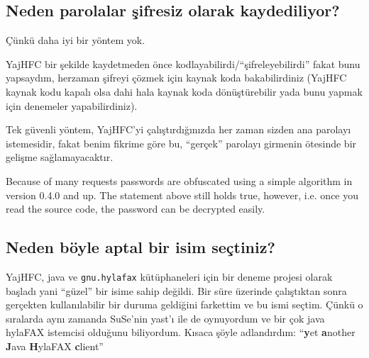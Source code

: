 \documentclass[a4paper,10pt]{scrartcl}
\begin{document}
\subsection{Neden parolalar şifresiz olarak kaydediliyor?}

Çünkü daha iyi bir yöntem yok.

YajHFC bir şekilde kaydetmeden önce kodlayabilirdi/``şifreleyebilirdi'' fakat
bunu yapsaydım, herzaman şifreyi çözmek için kaynak koda bakabilirdiniz 
(YajHFC kaynak kodu kapalı olsa dahi hala kaynak koda dönüştürebilir 
yada bunu yapmak için denemeler yapabilirdiniz).

Tek güvenli yöntem, YajHFC'yi çalıştırdığınızda her zaman sizden ana parolayı 
istemesidir, fakat benim fikrime göre bu, ``gerçek'' parolayı girmenin ötesinde
bir gelişme sağlamayacaktır.

Because of many requests passwords are obfuscated using a simple algorithm in version 0.4.0 and up.
The statement above still holds true, however, i.e. once you read the source code, the password can be decrypted easily.

\subsection{Neden böyle aptal bir isim seçtiniz?}

YajHFC, java ve \texttt{gnu.hylafax} kütüphaneleri için bir deneme projesi olarak başladı
yani ``güzel'' bir isime sahip değildi. Bir süre üzerinde çalıştıktan sonra 
gerçekten kullanılabilir bir duruma geldiğini farkettim ve bu ismi seçtim. 
Çünkü o sıralarda aynı zamanda SuSe'nin yast'ı ile de oynuyordum ve bir çok java hylaFAX istemcisi 
olduğunu biliyordum. Kısaca şöyle adlandırdım:
``\textbf{y}et \textbf{a}nother \textbf{J}ava \textbf{H}ylaFAX \textbf{c}lient''
\end{document}
